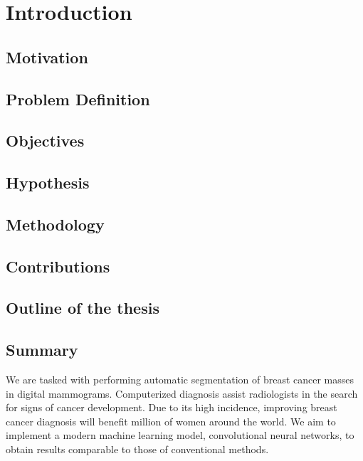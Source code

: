 \chapter{Introduction}
\label{ch:Introduction}


\section{Motivation}
\label{sec:Motivation}


\section{Problem Definition}
\label{sec:Problem}


\section{Objectives}
\label{sec:Objectives}


\section{Hypothesis}
\label{sec:Hypothesis}


\section{Methodology}
\label{sec:Methodology}


\section{Contributions}
\label{sec:Contributions}


\section{Outline of the thesis}
\label{sec:Outline}


\section{Summary}
We are tasked with performing automatic segmentation of breast cancer masses in digital mammograms. Computerized diagnosis assist radiologists in the search for signs of cancer development. Due to its high incidence, improving breast cancer diagnosis will benefit million of women around the world. We aim to implement a modern machine learning model, convolutional neural networks, to obtain results comparable to those of conventional methods.

